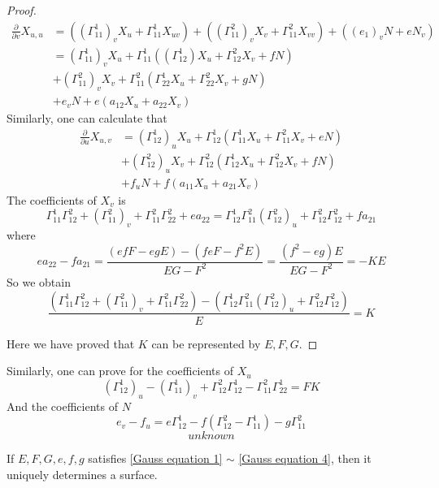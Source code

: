 \begin{proof}
    \begin{equation}
        \begin{aligned}
            \frac{\partial }{\partial v}X_{u,u}&=((\Gamma_{11}^1)_vX_u+\Gamma_{11}^1X_{uv})+((\Gamma_{11}^2)_vX_v+\Gamma_{11}^2X_{vv})+((e_1)_vN+eN_v)\\
            &=(\Gamma_{11}^1)_vX_u+\Gamma_{11}^1((\Gamma_{12}^1)X_u+\Gamma_{12}^2X_v+fN)\\
            &+(\Gamma_{11}^2)_vX_v+\Gamma_{11}^2(\Gamma_{22}^1X_u+\Gamma_{22}^2X_v+gN)\\
            &+e_vN+e(a_{12}X_u+a_{22}X_v)
        \end{aligned}
    \end{equation}
    Similarly, one can calculate that
    \begin{equation}
        \begin{aligned}
            \frac{\partial}{\partial u}X_{u,v}&=(\Gamma_{12}^1)_uX_u+\Gamma_{12}^1(\Gamma_{11}^1X_u+\Gamma_{11}^2X_v+eN)\\
            &+(\Gamma_{12}^2)_uX_v+\Gamma_{12}^2(\Gamma_{12}^1X_u+\Gamma_{12}^2X_v+fN)\\
            &+f_uN+f(a_{11}X_u+a_{21}X_v)
        \end{aligned}
    \end{equation}
    The coefficients of  $ X_v $ is 
    \[\Gamma_{11}^1\Gamma_{12}^2+(\Gamma_{11}^2)_v+\Gamma_{11}^2\Gamma_{22}^2+ea_{22}=\Gamma_{12}^1\Gamma_{11}^2(\Gamma_{12}^2)_u+\Gamma_{12}^2\Gamma_{12}^2+fa_{21}\]
    where 
    \[ea_{22}-fa_{21}=\frac{(efF-egE)-(feF-f^2E)}{EG-F^2}=\frac{(f^2-eg)E}{EG-F^2}=-KE\]
    So we obtain
    \begin{equation}\label{Gauss equation 1}
        \frac{(\Gamma_{11}^1\Gamma_{12}^2+(\Gamma_{11}^2)_v+\Gamma_{11}^2\Gamma_{22}^2)-(\Gamma_{12}^1\Gamma_{11}^2(\Gamma_{12}^2)_u+\Gamma_{12}^2\Gamma_{12}^2)}{E}=K
    \end{equation} 

    Here we have proved that  $ K  $ can be represented by  $ E,F,G $.
\end{proof}
Similarly, one can prove for the coefficients of  $ X_u $
    \begin{equation}
        (\Gamma_{12}^1)_u-(\Gamma_{11}^1)_v+\Gamma_{12}^2\Gamma_{12}^1-\Gamma_{11}^2\Gamma_{22}^1=FK
    \end{equation}
    And the coefficients of  $ N $
    \begin{equation}
        e_v-f_u=e\Gamma_{12}^1-f(\Gamma_{12}^2-\Gamma_{11}^1)-g\Gamma_{11}^2
    \end{equation} 
    \begin{equation}\label{Gauss equation 4}
        unknown
    \end{equation}
\begin{theorem}
    If  $ E,F,G,e,f,g $ satisfies \eqref{Gauss equation 1}  $ \sim $  \eqref{Gauss equation 4}, then it uniquely determines a surface.
\end{theorem}
